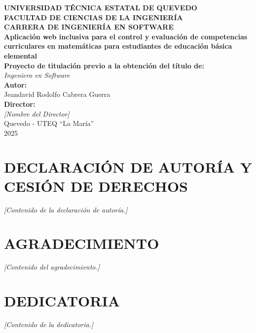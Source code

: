 \documentclass[12pt,a4paper]{report}
\begin{document}

\begin{titlepage}
  \centering
  \vspace*{2cm}
  {\large \textbf{UNIVERSIDAD TÉCNICA ESTATAL DE QUEVEDO}}\\[0.5cm]
  {\large \textbf{FACULTAD DE CIENCIAS DE LA INGENIERÍA}}\\[0.5cm]
  {\large \textbf{CARRERA DE INGENIERÍA EN SOFTWARE}}\\[2cm]

  {\Large\bfseries Aplicación web inclusiva para el control y evaluación de competencias curriculares en matemáticas para estudiantes de educación básica elemental}\\[2cm]

  \textbf{Proyecto de titulación previo a la obtención del título de:}\\[0.3cm]
  \textit{Ingeniero en Software}\\[2cm]

  \textbf{Autor:}\\
  Jeandavid Rodolfo Cabrera Guerra\\[1.5cm]

  \textbf{Director:}\\
  \textit{[Nombre del Director]}\\[3cm]

  Quevedo - UTEQ ``La María''\\
  2025
\end{titlepage}

\chapter*{DECLARACIÓN DE AUTORÍA Y CESIÓN DE DERECHOS}
\textit{[Contenido de la declaración de autoría.]}

\chapter*{AGRADECIMIENTO}
\textit{[Contenido del agradecimiento.]}

\chapter*{DEDICATORIA}
\textit{[Contenido de la dedicatoria.]}
\end{document}
